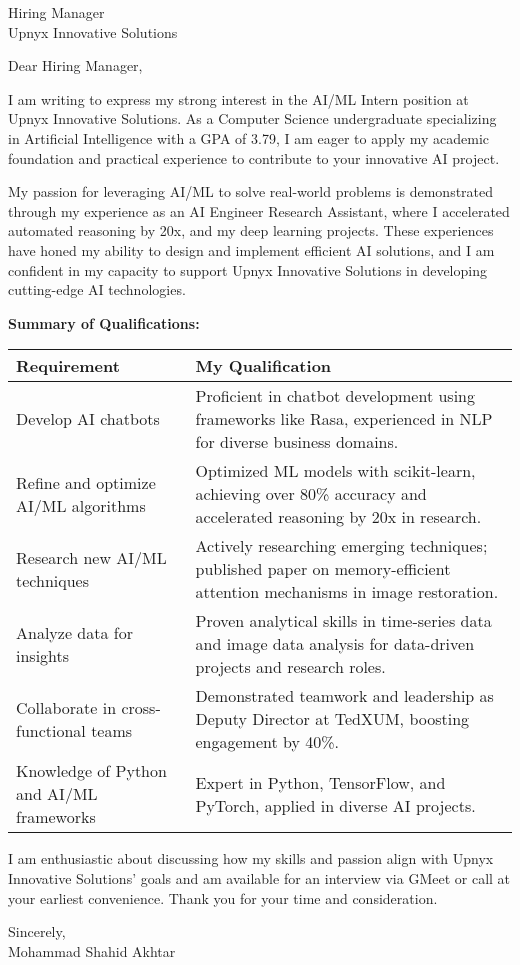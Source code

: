 \documentclass[10.5pt]{letter}
\date{\today}
\begin{document}
\begin{letter}{Hiring Manager\\Upnyx Innovative Solutions}

\opening{Dear Hiring Manager,}

I am writing to express my strong interest in the AI/ML Intern position at Upnyx Innovative Solutions. As a Computer Science undergraduate specializing in Artificial Intelligence with a GPA of 3.79, I am eager to apply my academic foundation and practical experience to contribute to your innovative AI project.

My passion for leveraging AI/ML to solve real-world problems is demonstrated through my experience as an AI Engineer Research Assistant, where I accelerated automated reasoning by 20x, and my deep learning projects. These experiences have honed my ability to design and implement efficient AI solutions, and I am confident in my capacity to support Upnyx Innovative Solutions in developing cutting-edge AI technologies.

\vspace{0.2cm}
\textbf{Summary of Qualifications:}
\vspace{0.1cm}

\renewcommand{\arraystretch}{1.3}
\begin{tabularx}{\textwidth}{@{}p{}X@{}}
\textbf{Requirement} & \textbf{My Qualification} \\
\hline
Develop AI chatbots & Proficient in chatbot development using frameworks like Rasa, experienced in NLP for diverse business domains. \\
Refine and optimize AI/ML algorithms & Optimized ML models with scikit-learn, achieving over 80\% accuracy and accelerated reasoning by 20x in research. \\
Research new AI/ML techniques & Actively researching emerging techniques; published paper on memory-efficient attention mechanisms in image restoration. \\
Analyze data for insights & Proven analytical skills in time-series data and image data analysis for data-driven projects and research roles. \\
Collaborate in cross-functional teams & Demonstrated teamwork and leadership as Deputy Director at TedXUM, boosting engagement by 40\%. \\
Knowledge of Python and AI/ML frameworks & Expert in Python, TensorFlow, and PyTorch, applied in diverse AI projects. \\
\end{tabularx}

\vspace{0.4cm}
I am enthusiastic about discussing how my skills and passion align with Upnyx Innovative Solutions' goals and am available for an interview via GMeet or call at your earliest convenience. Thank you for your time and consideration.

\vspace{0.4cm}
\begin{flushleft}
Sincerely,\\[1.5ex]
Mohammad Shahid Akhtar
\end{flushleft}

\end{letter}
\end{document}
